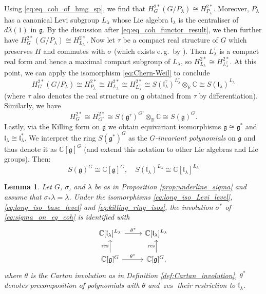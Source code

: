 \documentclass{amsart}
\newcommand{\eg}{e.\,g.}
\newcommand{\C}{\mathbb{C}}
\newcommand{\g}{\mathfrak{g}}
\newcommand{\el}{\mathfrak{l}}
\newcommand{\R}{\mathbb{R}}
\newcommand{\res}{\operatorname{res}}
\theoremstyle{definition}
\theoremstyle{plain}
\newtheorem{lem}[defn]{Lemma}
\theoremstyle{remark}
\begin{document}
Using \eqref{eq:eq_coh_of_hmg_sp}, we find that $H^{2*}_G(G/P_\lambda) \cong H^{2*}_{P_\lambda}$. Moreover, $P_\lambda$ has a canonical Levi subgroup $L_\lambda$ whose Lie algebra $\el_\lambda$ is the centraliser of $d\lambda(1)$ in $\g$. By the discussion after \eqref{eq:eq_coh_functor_result}, we then further have
$
    H^{2*}_G(G/P_\lambda) \cong H^{2*}_{L_\lambda}.
$
Now let $\tau$ be a compact real structure of $G$ which preserves $H$ and commutes with $\sigma$ (which exists \eg\ by \cite[Prop.\,II.6]{Onishchik2004_real}). Then $L_\lambda^\tau$ is a compact real form and hence a maximal compact subgroup of $L_\lambda$, so $H^{2*}_{L_\lambda} \cong H^{2*}_{L_\lambda^\tau}$. At this point, we can apply the isomorphism \eqref{eq:Chern-Weil} to conclude
\begin{equation}
\label{eq:long_iso_Levi_level}
    H^{2*}_G(G/P_\lambda) 
    \cong H^{2*}_{P_\lambda}
    \cong H^{2*}_{L_\lambda}
    \cong H^{2*}_{L_\lambda^\tau}
    \cong S(\el_\lambda^\tau)^{L_\lambda^\tau} \otimes_\R \C
    \cong S(\el_\lambda)^{L_\lambda}
\end{equation}
(where $\tau$ also denotes the real structure on $\g$ obtained from $\tau$ by differentiation). Similarly, we have
\begin{equation}
\label{eq:long_iso_base_level}
    H^{2*}_G
    \cong H^{2*}_{G^\tau}
    \cong S(\g^\tau)^{G^\tau} \otimes_\R \C
    \cong S(\g)^G.
\end{equation}
Lastly, via the Killing form on $\g$ we obtain equivariant isomorphisms $\g\cong \g^*$ and $\el_\lambda \cong \el_\lambda^*$. We interpret the ring $S(\g^*)^G$ as the \emph{$G$-invariant polynomials} on $\g$ and thus denote it as $\C[\g]^G$ (and extend this notation to other Lie algebras and Lie groups). Then:
\begin{equation}
\label{eq:killing_ring_isos}
    S(\g)^G \cong \C[\g]^G,
    \quad
    S(\el_\lambda)^{L_\lambda} \cong \C[\el_\lambda]^{L_\lambda}
\end{equation}
\begin{lem}
\label{lem:from_eq_coh_to_invrings}
    Let $G$, $\sigma$, and $\lambda$ be as in Proposition \ref{prop:underline_sigma} and assume that $\sigma_*\lambda = \lambda$. Under the isomorphisms \eqref{eq:long_iso_Levi_level}, \eqref{eq:long_iso_base_level} and \eqref{eq:killing_ring_isos}, the involution $\sigma^*$ of \eqref{eq:sigma_on_eq_coh} is identified with
    $$
    \begin{tikzcd}
        \C[\el_\lambda]^{L_\lambda}
            \arrow[r, "\theta^*"]
        & \C[\el_\lambda]^{L_\lambda} \\
        \C[\g]^G
            \arrow[u, "\res"]
            \arrow[r, "\theta^*"]
        & \C[\g]^G,
        \arrow[u, "\res"]
    \end{tikzcd}
    $$
    where $\theta$ is the Cartan involution as in Definition \ref{def:Cartan_involution}, $\theta^*$ denotes precomposition of polynomials with $\theta$ and $\res$ their restriction to $\el_\lambda$.  
\end{lem}
\end{document}
